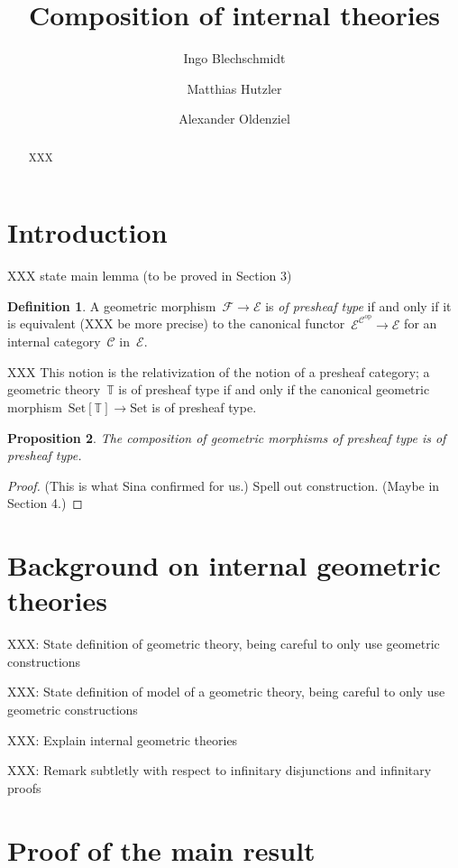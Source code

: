 \documentclass[oneside,reqno]{amsart}
\title{Composition of internal theories}
\author{Ingo Blechschmidt}
\author{Matthias Hutzler}
\author{Alexander Oldenziel}
\theoremstyle{definition}
\newtheorem{defn}{Definition}[section]
\theoremstyle{plain}
\newtheorem{prop}[defn]{Proposition}
\theoremstyle{remark}
\newcommand{\E}{\mathcal{E}}
\newcommand{\F}{\mathcal{F}}
\newcommand{\C}{\mathcal{C}}
\newcommand{\TT}{\mathbb{T}}
\newcommand{\op}{\mathrm{op}}
\newcommand{\Set}{\mathrm{Set}}
\renewcommand{\_}{\mathpunct{.}\,}
\newcommand{\?}{\,{:}\,}
\begin{document}
\begin{abstract}
  XXX
\end{abstract}

\maketitle
\thispagestyle{empty}

\section{Introduction}

XXX state main lemma (to be proved in Section 3)

\begin{defn}A geometric morphism~$\F \to \E$ is \emph{of presheaf type} if and
only if it is equivalent (XXX be more precise) to the canonical
functor~$\E^{\C^\op} \to \E$ for an internal category~$\C$ in~$\E$.\end{defn}

XXX This notion is the relativization of the notion of a presheaf category; a
geometric theory~$\TT$ is of presheaf type if and only if the canonical
geometric morphism~$\Set[\TT] \to \Set$ is of presheaf type.

\begin{prop}The composition of geometric morphisms of presheaf type is of
presheaf type.\end{prop}

\begin{proof}(This is what Sina confirmed for us.) Spell out construction.
(Maybe in Section 4.)
\end{proof}


\section{Background on internal geometric theories}

XXX: State definition of geometric theory, being careful to only use geometric
constructions

XXX: State definition of model of a geometric theory, being careful to only use
geometric constructions

XXX: Explain internal geometric theories

XXX: Remark subtletly with respect to infinitary disjunctions and infinitary
proofs


\section{Proof of the main result}
\end{document}
